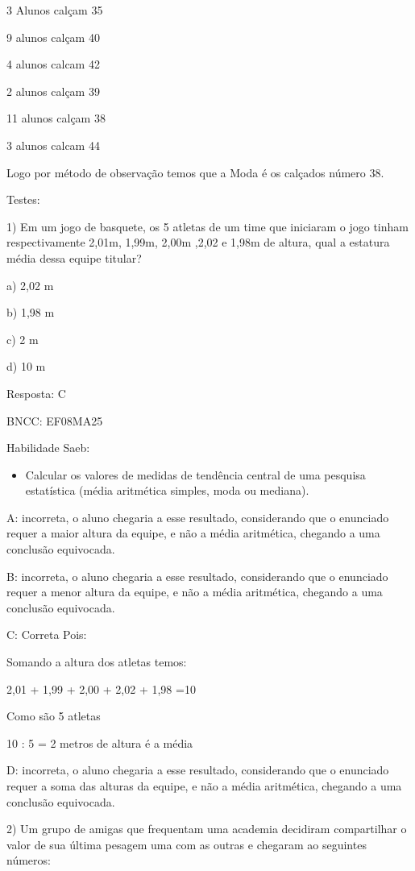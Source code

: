 {3 Alunos calçam 35

9 alunos calçam 40

4 alunos calcam 42

2 alunos calçam 39

11 alunos calçam 38

3 alunos calcam 44

Logo por método de observação temos que a Moda é os calçados número 38.

Testes:

1) Em um jogo de basquete, os 5 atletas de um time que iniciaram o jogo
tinham respectivamente 2,01m, 1,99m, 2,00m ,2,02 e 1,98m de altura, qual
a estatura média dessa equipe titular?

a) 2,02 m

b) 1,98 m

c) 2 m

d) 10 m

Resposta: C

BNCC: EF08MA25

Habilidade Saeb:

\begin{itemize}
\tightlist
\item
  Calcular os valores de medidas de tendência central de uma pesquisa
  estatística (média aritmética simples, moda ou mediana).
\end{itemize}

A: incorreta, o aluno chegaria a esse resultado, considerando que o
enunciado requer a maior altura da equipe, e não a média aritmética,
chegando a uma conclusão equivocada.

B: incorreta, o aluno chegaria a esse resultado, considerando que o
enunciado requer a menor altura da equipe, e não a média aritmética,
chegando a uma conclusão equivocada.

C: Correta Pois:

Somando a altura dos atletas temos:

2,01 + 1,99 + 2,00 + 2,02 + 1,98 =10

Como são 5 atletas

10 : 5 = 2 metros de altura é a média

D: incorreta, o aluno chegaria a esse resultado, considerando que o
enunciado requer a soma das alturas da equipe, e não a média aritmética,
chegando a uma conclusão equivocada.

2) Um grupo de amigas que frequentam uma academia decidiram compartilhar
o valor de sua última pesagem uma com as outras e chegaram ao seguintes
números:

}
